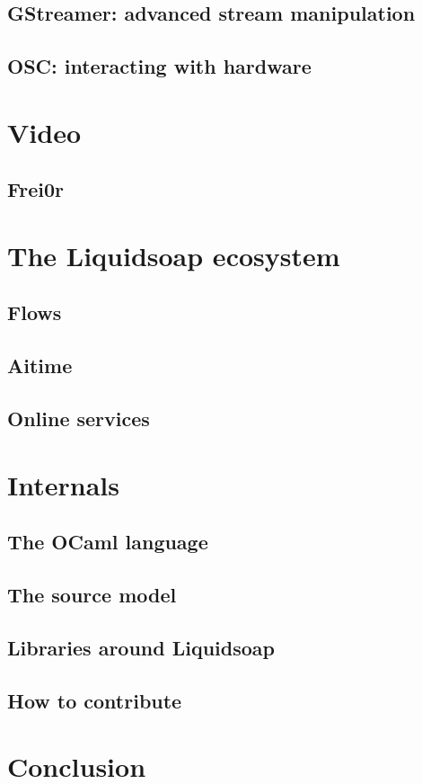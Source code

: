 \documentclass{book}
\begin{document}
\section{GStreamer: advanced stream manipulation}

\section{OSC: interacting with hardware}

\chapter{Video}

\section{Frei0r}

\chapter{The Liquidsoap ecosystem}
\section{Flows}

\section{Aitime}

\section{Online services}

\chapter{Internals}
\section{The OCaml language}

\section{The source model}

\section{Libraries around Liquidsoap}

\section{How to contribute}

\chapter{Conclusion}
\end{document}
